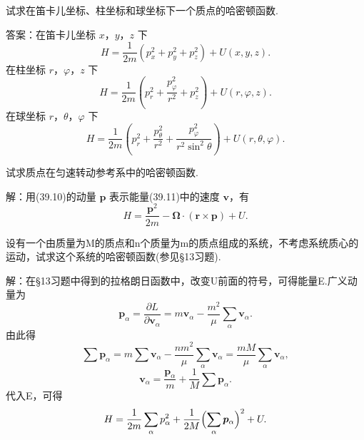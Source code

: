 \begin{xiti}

\quad 试求在笛卡儿坐标、柱坐标和球坐标下一个质点的哈密顿函数.

答案：在笛卡儿坐标 $x$，$y$，$z$ 下
\begin{equation*}
  H=\frac{1}{2m}\left(p_x^2+p_y^2+p_z^2\right)+U(x,y,z).
\end{equation*}
在柱坐标 $r$，$\varphi$，$z$ 下
\begin{equation*}
  H=\frac{1}{2m}\left(p_r^2+\frac{p_\varphi^2}{r^2}+p_z^2\right)+U(r,\varphi,z).
\end{equation*}
在球坐标 $r$，$\theta$，$\varphi$ 下
\begin{equation*}
  H=\frac{1}{2m}\left(p_r^2+\frac{p_\theta^2}{r^2}
  +\frac{p_\varphi^2}{r^2\sin^2\theta}\right)+U(r,\theta,\varphi).
\end{equation*}

\quad 试求质点在匀速转动参考系中的哈密顿函数.

解：用(39.10)的动量 $\boldsymbol{p}$ 表示能量(39.11)中的速度 $\boldsymbol{v}$，有
\begin{equation*}
  H=\frac{\boldsymbol{p}^2}{2m}
  -\boldsymbol{\Omega}\cdot(\boldsymbol{r}\times\boldsymbol{p})+U.
\end{equation*}

\quad 设有一个由质量为M的质点和n个质量为m的质点组成的系统，不考虑系统质心的运动，试求这个系统的哈密顿函数(参见§13习题).

解：在§13习题中得到的拉格朗日函数中，改变U前面的符号，可得能量E.广义动量为
\begin{equation*}
  \boldsymbol{p}_\alpha=\frac{\partial L}{\partial\boldsymbol{v}_\alpha}
  =m\boldsymbol{v}_\alpha-\frac{m^2}{\mu}\sum_\alpha\boldsymbol{v}_\alpha.
\end{equation*}
由此得
\begin{equation*}
  \sum\boldsymbol{p}_\alpha=m\sum\boldsymbol{v}_\alpha
  -\frac{nm^2}{\mu}\sum_\alpha\boldsymbol{v}_\alpha
  =\frac{mM}{\mu}\sum_\alpha\boldsymbol{v}_\alpha,
\end{equation*}
\begin{equation*}
  \boldsymbol{v}_\alpha=\frac{\boldsymbol{p}_\alpha}{m}
  +\frac{1}{M}\sum\boldsymbol{p}_\alpha.
\end{equation*}
代入E，可得
\begin{equation*}
  H=\frac{1}{2m}\sum_\alpha p_\alpha^2
  +\frac{1}{2M}\Bigl(\sum_\alpha\boldsymbol{p}_\alpha\Bigr)^2+U.
\end{equation*}

\end{xiti}

